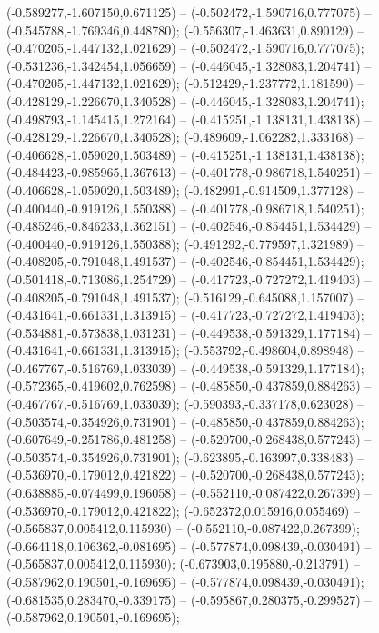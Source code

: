  (-0.589277,-1.607150,0.671125) -- (-0.502472,-1.590716,0.777075) -- (-0.545788,-1.769346,0.448780);
 (-0.556307,-1.463631,0.890129) -- (-0.470205,-1.447132,1.021629) -- (-0.502472,-1.590716,0.777075);
 (-0.531236,-1.342454,1.056659) -- (-0.446045,-1.328083,1.204741) -- (-0.470205,-1.447132,1.021629);
 (-0.512429,-1.237772,1.181590) -- (-0.428129,-1.226670,1.340528) -- (-0.446045,-1.328083,1.204741);
 (-0.498793,-1.145415,1.272164) -- (-0.415251,-1.138131,1.438138) -- (-0.428129,-1.226670,1.340528);
 (-0.489609,-1.062282,1.333168) -- (-0.406628,-1.059020,1.503489) -- (-0.415251,-1.138131,1.438138);
 (-0.484423,-0.985965,1.367613) -- (-0.401778,-0.986718,1.540251) -- (-0.406628,-1.059020,1.503489);
 (-0.482991,-0.914509,1.377128) -- (-0.400440,-0.919126,1.550388) -- (-0.401778,-0.986718,1.540251);
 (-0.485246,-0.846233,1.362151) -- (-0.402546,-0.854451,1.534429) -- (-0.400440,-0.919126,1.550388);
 (-0.491292,-0.779597,1.321989) -- (-0.408205,-0.791048,1.491537) -- (-0.402546,-0.854451,1.534429);
 (-0.501418,-0.713086,1.254729) -- (-0.417723,-0.727272,1.419403) -- (-0.408205,-0.791048,1.491537);
 (-0.516129,-0.645088,1.157007) -- (-0.431641,-0.661331,1.313915) -- (-0.417723,-0.727272,1.419403);
 (-0.534881,-0.573838,1.031231) -- (-0.449538,-0.591329,1.177184) -- (-0.431641,-0.661331,1.313915);
 (-0.553792,-0.498604,0.898948) -- (-0.467767,-0.516769,1.033039) -- (-0.449538,-0.591329,1.177184);
 (-0.572365,-0.419602,0.762598) -- (-0.485850,-0.437859,0.884263) -- (-0.467767,-0.516769,1.033039);
 (-0.590393,-0.337178,0.623028) -- (-0.503574,-0.354926,0.731901) -- (-0.485850,-0.437859,0.884263);
 (-0.607649,-0.251786,0.481258) -- (-0.520700,-0.268438,0.577243) -- (-0.503574,-0.354926,0.731901);
 (-0.623895,-0.163997,0.338483) -- (-0.536970,-0.179012,0.421822) -- (-0.520700,-0.268438,0.577243);
 (-0.638885,-0.074499,0.196058) -- (-0.552110,-0.087422,0.267399) -- (-0.536970,-0.179012,0.421822);
 (-0.652372,0.015916,0.055469) -- (-0.565837,0.005412,0.115930) -- (-0.552110,-0.087422,0.267399);
 (-0.664118,0.106362,-0.081695) -- (-0.577874,0.098439,-0.030491) -- (-0.565837,0.005412,0.115930);
 (-0.673903,0.195880,-0.213791) -- (-0.587962,0.190501,-0.169695) -- (-0.577874,0.098439,-0.030491);
 (-0.681535,0.283470,-0.339175) -- (-0.595867,0.280375,-0.299527) -- (-0.587962,0.190501,-0.169695);
